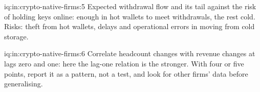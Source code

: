 \begin{solution}{iq:in:crypto-native-firms:5}
Expected withdrawal flow and its tail against the risk of holding keys online: enough in hot wallets to meet
withdrawals, the rest cold. Risks: theft from hot wallets, delays and operational errors in moving from cold storage.
\end{solution}

\begin{solution}{iq:in:crypto-native-firms:6}
Correlate headcount changes with revenue changes at lags zero and one: here the lag-one relation is the stronger. With
four or five points, report it as a pattern, not a test, and look for other firms' data before generalising.
\end{solution}
